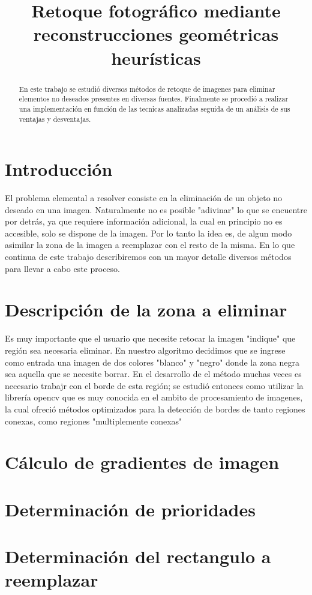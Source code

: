 \documentclass[conference]{IEEEtran}
\begin{document}
\title{Retoque fotográfico mediante reconstrucciones geométricas heurísticas}
\maketitle

\begin{abstract}
En este trabajo se estudió diversos métodos de retoque de imagenes para eliminar elementos no deseados presentes en diversas fuentes. Finalmente se procedió a realizar una implementación en función de las tecnicas analizadas seguida de un análisis de sus ventajas y desventajas.
\end{abstract}

\section{Introducción}
El problema elemental a resolver consiste en la eliminación de un objeto no deseado en una imagen.
Naturalmente no es posible "adivinar" lo que se encuentre por detrás, ya que requiere información adicional, la cual en principio no es accesible, solo se dispone de la imagen. Por lo tanto la idea es, de algun modo asimilar la zona de la imagen a reemplazar con el resto de la misma. En lo que continua de este trabajo describiremos con un mayor detalle diversos métodos para llevar a cabo este proceso.

\section{Descripción de la zona a eliminar}
Es muy importante que el usuario que necesite retocar la imagen "indique" que región sea necesaria eliminar. En nuestro algoritmo decidimos que se ingrese como entrada una imagen de dos colores "blanco" y "negro" donde la zona negra sea aquella que se necesite borrar. En el desarrollo de el método muchas veces es necesario trabajr con el borde de esta región; se estudió entonces como utilizar la librería opencv que es muy conocida en el ambito de procesamiento de imagenes, la cual ofreció métodos optimizados para la detección de bordes de tanto regiones conexas, como regiones "multiplemente conexas"


\section{Cálculo de gradientes de imagen}

\section{Determinación de prioridades}

\section{Determinación del rectangulo a reemplazar}
\end{document}

